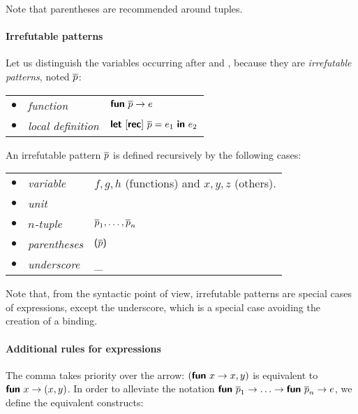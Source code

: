 \bigskip

\noindent Note that parentheses are recommended around tuples.

\paragraph{Irrefutable patterns}

Let us distinguish the variables occurring after \Xlet{} and \Xfun{},
because they are \emph{irrefutable patterns}, noted $\overline{p}$:

\bigskip

\begin{tabular}{rll}
    $\bullet$
  & \emph{function}
  & $\textsf{\textbf{fun}} \,\, \overline{p} \rightarrow e$\\
    $\bullet$
  & \emph{local definition}
  & \(\textsf{\textbf{let}} \,\, \textrm{[}\textsf{\textbf{rec}}\textrm{]} \,\, \overline{p} = e_1 \,\,
    \textsf{\textbf{in}} \,\, e_2\)
\end{tabular}

\bigskip

\noindent An irrefutable pattern $\overline{p}$ is defined recursively by
the following cases:

\bigskip

\begin{tabular}{rll}
    $\bullet$
  & \emph{variable}
  & $f, g, h$ (functions) and $x, y, z$ (others). \\
    $\bullet$
  & \emph{unit}
  & \unit\\
    $\bullet$
  & \emph{$n$-tuple}
  & $\overline{p}_1, \ldots, \overline{p}_n$\\
    $\bullet$
  & \emph{parentheses}
  & $\textsf{(}\overline{p}\textsf{)}$\\
    $\bullet$
  & \emph{underscore}
  & {\Large \_}
\end{tabular}

\bigskip

Note that, from the syntactic point of view, irrefutable patterns are
special cases of expressions, except the underscore, which is a
special case avoiding the creation of a binding.

\paragraph{Additional rules for expressions}

The comma takes priority over the arrow: $(\textsf{\textbf{fun}} \,\, x \rightarrow x,
y)$ is equivalent to $\textsf{\textbf{fun}} \,\, x \rightarrow (x,y)$. In order to
alleviate the notation
$\textsf{\textbf{fun}} \,\, \overline{p}_1 \rightarrow \ldots \rightarrow \textsf{\textbf{fun}} \,\, \overline{p}_n \rightarrow
e$, we define the equivalent constructs:

